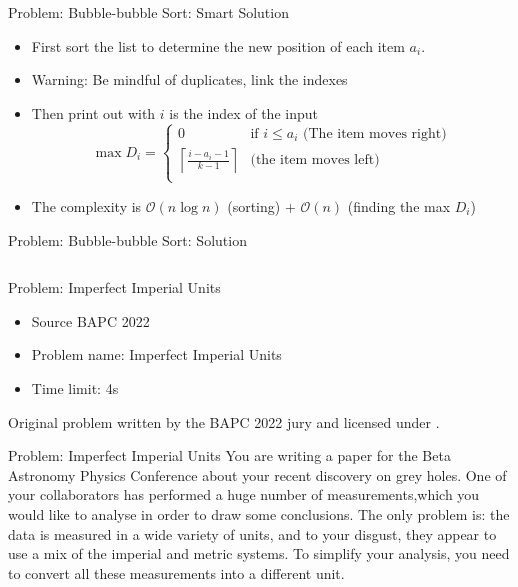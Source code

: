 \documentclass[11pt,pdf, aspectratio=169]{beamer}
\begin{document}
  \begin{frame}{Problem: Bubble-bubble Sort: Smart Solution}
    \begin{itemize}
      \item<1-> First sort the list to determine the new position of each item $a_i$.
      \item<1-> Warning: Be mindful of duplicates, link the indexes
      \item<2-> Then print out with $i$ is the index of the input
      \[\max D_i = \begin{cases}
                     0 & \text{if } i \leq a_i \text{ (The item moves right)}\\
                     \left\lceil\frac{i-a_i - 1}{k-1}\right\rceil & \text{(the item moves left)} \\
      \end{cases}\]
      \item<3-> The complexity is $\mathcal{O}(n\log{}n)$ (sorting) + $\mathcal{O}(n)$ (finding the max $D_i$)
    \end{itemize}
  \end{frame}
  \begin{frame}[containsverbatim]{ Problem: Bubble-bubble Sort: Solution}
    \inputminted{python}{code/session-1/python/dapc-b.py}
  \end{frame}
  \begin{frame}{Problem: Imperfect Imperial Units}
    \begin{itemize}
      \item Source BAPC 2022
      \item Problem name: Imperfect Imperial Units
      \item Time limit: 4s
    \end{itemize}
    Original problem written by the BAPC 2022 jury and licensed under \doclicenseLongNameRef.

    \doclicenseImage
  \end{frame}
  \begin{frame}{Problem: Imperfect Imperial Units}
    You are writing a paper for the Beta Astronomy Physics Conference about your recent discovery on grey holes.
    One of your collaborators has performed a huge number of measurements,which you would like to analyse in order to draw some conclusions.
    The only problem is: the data is measured in a wide variety of units, and to your disgust, they appear to use a mix of the imperial and metric systems.
    To simplify your analysis, you need to convert all these measurements into a different unit.
  \end{frame}
\end{document}

